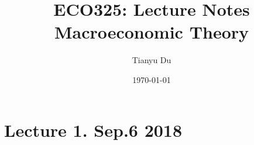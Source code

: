\documentclass[]{article}
\title{ECO325: Lecture Notes \\ Macroeconomic Theory}
\author{Tianyu Du}
\date{\today}
\begin{document}
    \maketitle 
    \tableofcontents
    \section{Lecture 1. Sep.6 2018}
    
\end{document}
